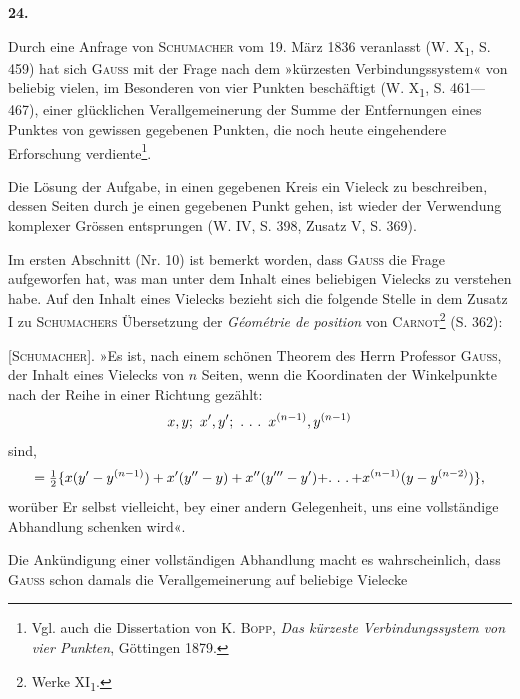 \clearpage\begingroup{}
\renewcommand{\thefootnote}{\arabic{footnote})}\setcounter{footnote}{1}
\begin{center}
\textbf{24.}\par\smallskip
{}
\end{center}
\noindent\hspace*{\parindent}Durch eine Anfrage von \textsc{Schumacher} vom 19. März 1836 veranlasst
(W. X\textsubscript{1}, S. 459) hat sich \textsc{Gauss} mit der Frage nach dem »kürzesten Verbindungssystem«
von beliebig vielen, im Besonderen von vier Punkten beschäftigt
(W. X\textsubscript{1}, S. 461—467), einer glücklichen Verallgemeinerung der
Summe der Entfernungen eines Punktes von gewissen gegebenen Punkten,
die noch heute eingehendere Erforschung verdiente\footnote{Vgl. auch die Dissertation von K. \textsc{Bopp}, \textit{Das kürzeste Verbindungssystem von vier Punkten}, Göttingen 1879.}.
\par
Die Lösung der Aufgabe, in einen gegebenen Kreis ein Vieleck zu beschreiben,
dessen Seiten durch je einen gegebenen Punkt gehen, ist wieder
der Verwendung komplexer Grössen entsprungen (W. IV, S. 398, Zusatz V,
S. 369).
\par
Im ersten Abschnitt (Nr. 10) ist bemerkt worden, dass \textsc{Gauss} die Frage
aufgeworfen hat, was man unter dem Inhalt eines beliebigen Vielecks zu
\clearpage{}\setcounter{footnote}{0}
\noindent verstehen habe. Auf den Inhalt eines Vielecks bezieht sich die folgende Stelle
in dem Zusatz I zu \textsc{Schumachers} Übersetzung der \textit{Géométrie de position} von
\textsc{Carnot}\footnote{Werke XI\textsubscript{1}.} (S. 362):
\par
{} [\textsc{Schumacher}]. »Es ist, nach einem
schönen Theorem des Herrn Professor \textsc{Gauss}, der Inhalt eines Vielecks von
\(n\) Seiten, wenn die Koordinaten der Winkelpunkte nach der Reihe in einer
Richtung gezählt:
\[
x,y;\ x',y';\ \ldotp\,\ldotp\,\ldotp\ x^{(n-1)},y^{(n-1)}
\]
sind,
\[
=\tfrac12\{x(y'-y^{(n-1)})+x'(y''-y)+x''(y'''-y')+\ldotp\,\ldotp\,\ldotp+x^{(n-1)}(y-y^{(n-2)})\},
\]
worüber Er selbst vielleicht, bey einer andern Gelegenheit, uns eine vollständige
Abhandlung schenken wird«.
\par
Die Ankündigung einer vollständigen Abhandlung macht es wahrscheinlich,
dass \textsc{Gauss} schon damals die Verallgemeinerung auf beliebige Vielecke
